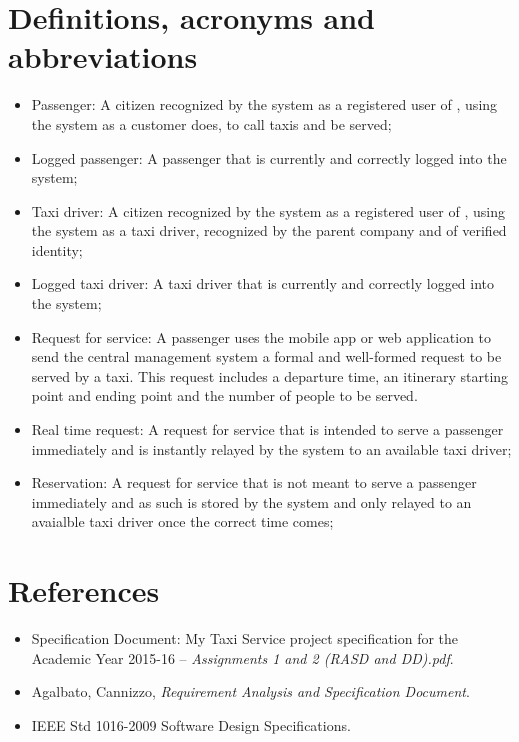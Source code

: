 \section{Definitions, acronyms and abbreviations}
\begin{itemize}

\item Passenger: A citizen recognized by the system as a registered user of \mts{}, using the system as a customer does, to call taxis and be served;
\item Logged passenger: A passenger that is currently and correctly logged into the system;
\item Taxi driver:  A citizen recognized by the system as a registered user of \mts{}, using the system as a taxi driver, recognized by the parent company and of verified identity;
\item Logged taxi driver: A taxi driver that is currently and correctly logged into the system;
\item Request for service: A passenger uses the mobile app or web application to send the central management system a formal and well-formed request to be served by a taxi. This request includes a departure time, an itinerary starting point and ending point and the number of people to be served.
\item Real time request: A request for service that is intended to serve a passenger immediately and is instantly relayed by the system to an available taxi driver;
\item Reservation: A request for service that is not meant to serve a passenger immediately and as such is stored by the system and only relayed to an avaialble taxi driver once the correct time comes;

\end{itemize}


\section{References}
\begin{itemize}

\item Specification Document: My Taxi Service project specification for the Academic Year 2015-16 -- \emph{Assignments 1 and 2 (RASD and DD).pdf}.
\item Agalbato, Cannizzo, \emph{Requirement Analysis and Specification Document}.
\item IEEE Std 1016-2009 Software Design Specifications.
\end{itemize}


